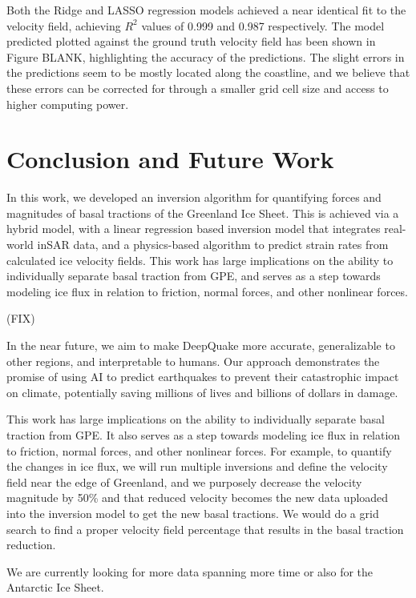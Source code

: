 \documentclass{article}
\begin{document}
Both the Ridge and LASSO regression models achieved a near identical fit to the velocity field, achieving $R^{2}$ values of 0.999 and 0.987 respectively. The model predicted plotted against the ground truth velocity field has been shown in Figure BLANK, highlighting the accuracy of the predictions. The slight errors in the predictions seem to be mostly located along the coastline, and we believe that these errors can be corrected for through a smaller grid cell size and access to higher computing power. 


\section{Conclusion and Future Work}

In this work, we developed an inversion algorithm for quantifying forces and magnitudes of basal tractions of the Greenland Ice Sheet. This is achieved via a hybrid model, with a linear regression based inversion model that integrates real-world inSAR data, and a physics-based algorithm to predict strain rates from calculated ice velocity fields. This work has large implications on the ability to individually separate basal traction from GPE, and serves as a step towards modeling ice flux in relation to friction, normal forces, and other nonlinear forces.

(FIX)

In the near future, we aim to make DeepQuake more accurate, generalizable to other regions, and interpretable to
humans. Our approach demonstrates the promise of using AI to predict earthquakes to prevent their
catastrophic impact on climate, potentially saving millions of lives and billions of dollars in damage.

\cite{briner_rate_2020}

This work has large implications on the ability to individually separate basal traction from GPE. It also serves as a step towards modeling ice flux in relation to friction, normal forces, and other nonlinear forces. For example, to quantify the changes in ice flux, we will run multiple inversions and define the velocity field near the edge of Greenland, and we purposely decrease the velocity magnitude by 50\% and that reduced velocity becomes the new data uploaded into the inversion model to get the new basal tractions. We would do a grid search to find a proper velocity field percentage that results in the basal traction reduction.

We are currently looking for more data spanning more time or also for the Antarctic Ice Sheet.


\small


\end{document}
